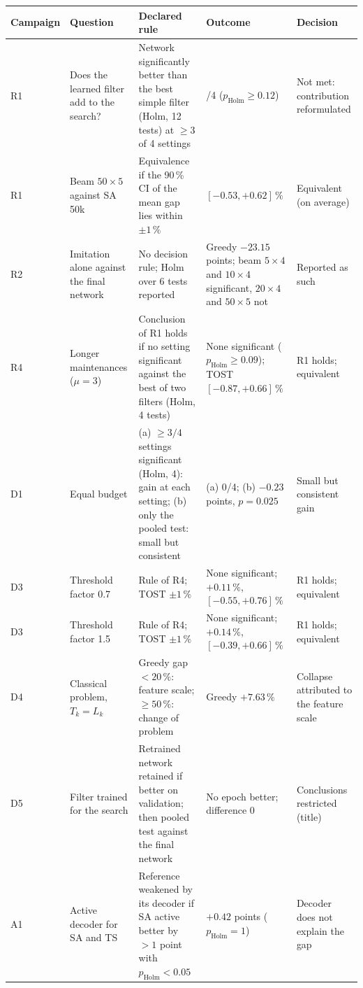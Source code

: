 \begin{tabular}{@{}l>{\raggedright\arraybackslash}p{3.0cm}>{\raggedright\arraybackslash}p{4.2cm}>{\raggedright\arraybackslash}p{3.6cm}>{\raggedright\arraybackslash}p{2.6cm}@{}}
\toprule
Campaign & Question & Declared rule & Outcome & Decision \\
\midrule
R1 & Does the learned filter add to the search? & Network significantly better than the best simple filter (Holm, 12 tests) at $\geq 3$ of 4 settings & 0/4 ($p_{\mathrm{Holm}} \geq 0.12$) & Not met: contribution reformulated \\
R1 & Beam $50 \times 5$ against SA 50k & Equivalence if the 90\,\% CI of the mean gap lies within $\pm 1\,\%$ & $[-0.53, +0.62]\,\%$ & Equivalent (on average) \\
R2 & Imitation alone against the final network & No decision rule; Holm over 6 tests reported & Greedy $-23.15$ points; beam $5 \times 4$ and $10 \times 4$ significant, $20 \times 4$ and $50 \times 5$ not & Reported as such \\
R4 & Longer maintenances ($\mu = 3$) & Conclusion of R1 holds if no setting significant against the best of two filters (Holm, 4 tests) & None significant ($p_{\mathrm{Holm}} \geq 0.09$); TOST $[-0.87, +0.66]\,\%$ & R1 holds; equivalent \\
D1 & Equal budget & (a) $\geq 3/4$ settings significant (Holm, 4): gain at each setting; (b) only the pooled test: small but consistent & (a) 0/4; (b) $-0.23$ points, $p = 0.025$ & Small but consistent gain \\
D3 & Threshold factor 0.7 & Rule of R4; TOST $\pm 1\,\%$ & None significant; $+0.11\,\%$, $[-0.55, +0.76]\,\%$ & R1 holds; equivalent \\
D3 & Threshold factor 1.5 & Rule of R4; TOST $\pm 1\,\%$ & None significant; $+0.14\,\%$, $[-0.39, +0.66]\,\%$ & R1 holds; equivalent \\
D4 & Classical problem, $T_k = L_k$ & Greedy gap $< 20\,\%$: feature scale; $\geq 50\,\%$: change of problem & Greedy $+7.63\,\%$ & Collapse attributed to the feature scale \\
D5 & Filter trained for the search & Retrained network retained if better on validation; then pooled test against the final network & No epoch better; difference 0 & Conclusions restricted (title) \\
A1 & Active decoder for SA and TS & Reference weakened by its decoder if SA active better by $> 1$ point with $p_{\mathrm{Holm}} < 0.05$ & $+0.42$ points ($p_{\mathrm{Holm}} = 1$) & Decoder does not explain the gap \\

\end{tabular}
